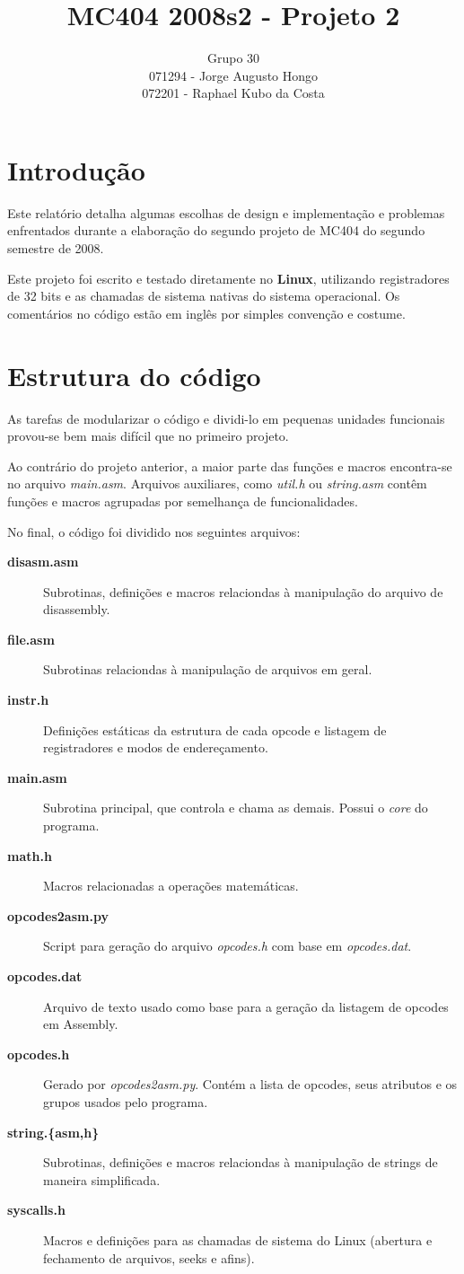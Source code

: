 \documentclass{article}
\title{\textbf{MC404 2008s2 - Projeto 2}}
\author{Grupo 30\\
071294 - Jorge Augusto Hongo\\
072201 - Raphael Kubo da Costa}
\begin{document}
\maketitle

\section{Introdução}
Este relatório detalha algumas escolhas de design e implementação e problemas enfrentados durante a elaboração do segundo projeto de MC404 do segundo semestre de 2008.

Este projeto foi escrito e testado diretamente no \textbf{Linux}, utilizando registradores de 32 bits e as chamadas de sistema nativas do sistema operacional. Os comentários no código estão em inglês por simples convenção e costume.


\section{Estrutura do código}
As tarefas de modularizar o código e dividi-lo em pequenas unidades funcionais provou-se bem mais difícil que no primeiro projeto.

Ao contrário do projeto anterior, a maior parte das funções e macros encontra-se no arquivo \textit{main.asm}. Arquivos auxiliares, como \textit{util.h} ou \textit{string.asm} contêm funções e macros agrupadas por semelhança de funcionalidades.

No final, o código foi dividido nos seguintes arquivos:

\begin{description}
\item[\textbf{disasm.asm}]
  Subrotinas, definições e macros relaciondas à manipulação do arquivo de disassembly.
\item[\textbf{file.asm}]
  Subrotinas relaciondas à manipulação de arquivos em geral.
\item[\textbf{instr.h}]
  Definições estáticas da estrutura de cada opcode e listagem de registradores e modos de endereçamento.
\item[\textbf{main.asm}]
  Subrotina principal, que controla e chama as demais. Possui o \textit{core} do programa.
\item[\textbf{math.h}]
  Macros relacionadas a operações matemáticas.
\item[\textbf{opcodes2asm.py}]
  Script para geração do arquivo \textit{opcodes.h} com base em \textit{opcodes.dat}.
\item[\textbf{opcodes.dat}]
  Arquivo de texto usado como base para a geração da listagem de opcodes em Assembly.
\item[\textbf{opcodes.h}]
  Gerado por \textit{opcodes2asm.py}. Contém a lista de opcodes, seus atributos e os grupos usados pelo programa.
\item[\textbf{string.\{asm,h\}}]
  Subrotinas, definições e macros relaciondas à manipulação de strings de maneira simplificada.
\item[\textbf{syscalls.h}]
  Macros e definições para as chamadas de sistema do Linux (abertura e fechamento de arquivos, seeks e afins).
\end{description}
\end{document}

